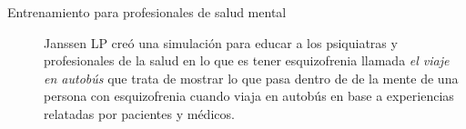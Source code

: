 \begin{description}
\item[Entrenamiento para profesionales de salud mental] Janssen LP creó una
	simulación para educar a los psiquiatras y profesionales de la salud en
	lo que es tener esquizofrenia llamada \emph{el viaje en autobús} que
	trata de mostrar lo que pasa dentro de de la mente de una persona con
	esquizofrenia cuando viaja en autobús en base a experiencias relatadas
	por pacientes y médicos\cite{mantovani:vr}. 

\end{description}

